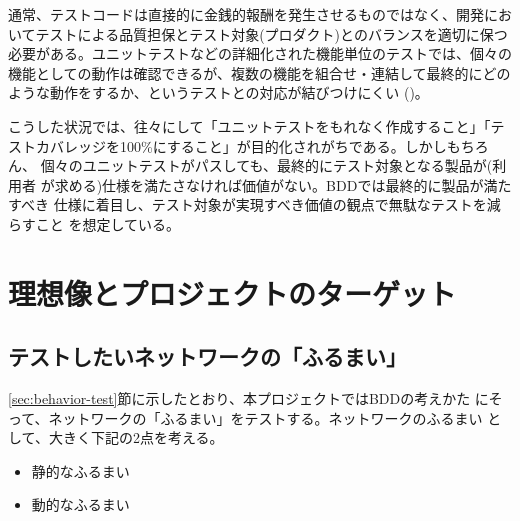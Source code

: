 通常、テストコードは直接的に金銭的報酬を発生させるものではなく、開発にお
いてテストによる品質担保とテスト対象(プロダクト)とのバランスを適切に保つ
必要がある。ユニットテストなどの詳細化された機能単位のテストでは、個々の
機能としての動作は確認できるが、複数の機能を組合せ・連結して最終的にどの
ような動作をするか、というテストとの対応が結びつけにくい
()。

こうした状況では、往々にして「ユニットテストをもれなく作成すること」「テ
ストカバレッジを100\%にすること」が目的化されがちである。しかしもちろん、
個々のユニットテストがパスしても、最終的にテスト対象となる製品が(利用者
が求める)仕様を満たさなければ価値がない。BDDでは最終的に製品が満たすべき
仕様に着目し、テスト対象が実現すべき価値の観点で無駄なテストを減らすこと
を想定している。

 \section{理想像とプロジェクトのターゲット}
 \label{sec:desired-and-target}


  \subsection{テストしたいネットワークの「ふるまい」}
  \label{sec:behavior-to-test}

\ref{sec:behavior-test}節に示したとおり、本プロジェクトではBDDの考えかた
にそって、ネットワークの「ふるまい」をテストする。ネットワークのふるまい
として、大きく下記の2点を考える。
\begin{itemize}
 \item 静的なふるまい
 \item 動的なふるまい
\end{itemize}

